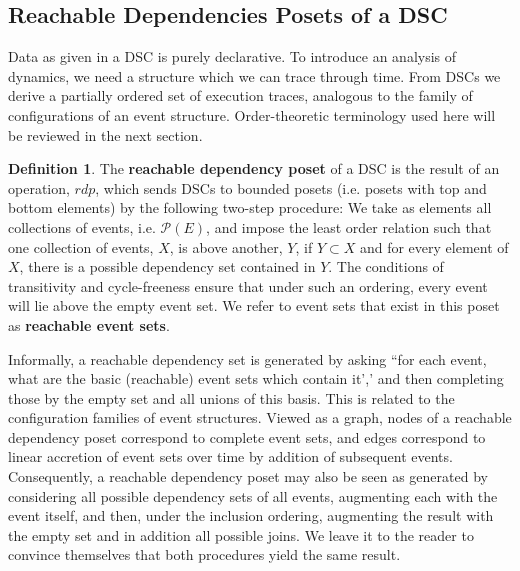 \documentclass[hoptionsi,review,screen,format=acmsmall]{acmart}
\theoremstyle{definition}
\newtheorem{definition}{Definition}[section]
\newcommand{\Pc}{\mathcal{P}}
\begin{document}
\subsection{Reachable Dependencies Posets of a DSC}

Data as given in a DSC is purely declarative. To introduce an analysis of dynamics, we need a structure which we can trace through time. From DSCs we derive a partially ordered set of execution traces, analogous to the family of configurations of an event structure. Order-theoretic terminology used here will be reviewed in the next section.

\begin{definition} The \textbf{reachable dependency poset} of a DSC is the result of an operation, \(rdp\), which sends DSCs to bounded posets (i.e. posets with top and bottom elements) by the following two-step procedure:  We take as elements all collections of events, i.e. \(\Pc(E)\), and impose the least order relation such that one collection of events, \(X\), is above another, \(Y\), if \(Y \subset X\) and for every element of \(X\), there is a possible dependency set contained in \(Y\).  The conditions of transitivity and cycle-freeness ensure that under such an ordering, every event will lie above the empty event set. We refer to event sets that exist in this poset as \textbf{reachable event sets}.
\end{definition}

Informally, a reachable dependency set is generated by asking ``for each event, what are the basic (reachable) event sets which contain it',' and then completing those by the empty set and all unions of this basis. This is related to the configuration families of event structures. Viewed as a graph, nodes of a reachable dependency poset correspond to complete event sets, and edges correspond to linear accretion of event sets over time by addition of subsequent events. Consequently, a reachable dependency poset may also be seen as generated by considering all possible dependency sets of all events, augmenting each with the event itself, and then, under the inclusion ordering, augmenting the result with the empty set and in addition all possible joins. We leave it to the reader to convince themselves that both procedures yield the same result.
\end{document}
